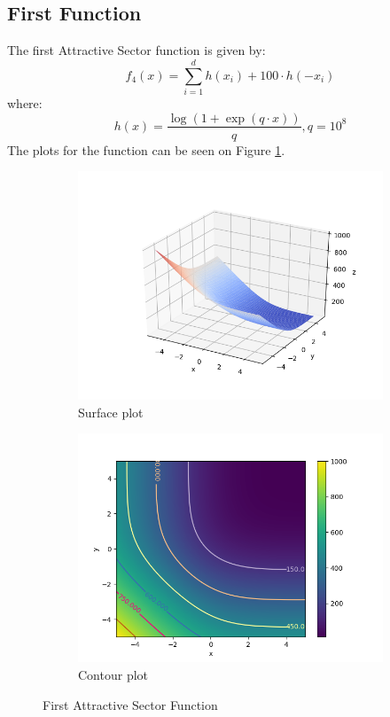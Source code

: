 \documentclass[a4paper]{article}
\begin{document}
\subsection{First Function}
The first Attractive Sector function is given by:
\[
f_{4}(x)=\sum_{i=1}^{d} h\left(x_{i}\right)+100 \cdot h\left(-x_{i}\right)
\]
where:
\[
h(x)=\frac{\log (1+\exp (q \cdot x))}{q}, q=10^{8}
\]
The plots for the function can be seen on Figure \ref{plt4}.
\begin{figure}[H]
  \centering
  \begin{subfigure}[b]{0.49\textwidth}
    \centering
    \includegraphics[width=\textwidth]{imgs/plt41}
    \caption{Surface plot}
  \end{subfigure}
  \begin{subfigure}[b]{0.49\textwidth}
    \centering
    \includegraphics[width=\textwidth]{imgs/plt42}
    \caption{Contour plot}
  \end{subfigure}
  \caption{First Attractive Sector Function}
  \label{plt4}
\end{figure}
\end{document}
